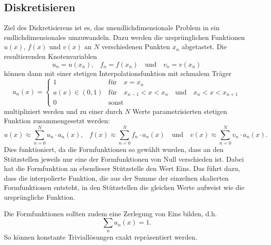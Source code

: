 \subsection{Diskretisieren\label{fem:1d:diskretisieren}}
Ziel des Diskretisierens ist es, das unendlichdimensionale Problem in ein endlichdimensionales umzuwandeln.
Dazu werden die ursprünglichen Funktionen $u(x)$, $f(x)$ und $v(x)$ an $N$ verschiedenen Punkten $x_n$ abgetastet.
Die resultierenden Knotenvariablen
\begin{equation}
    u_n = u(x_n) 
    \text{,} \quad
    f_n = f(x_n)
    \quad \text{und} \quad
    v_n = v(x_n)
\end{equation}
können dann mit einer stetigen Interpolationsfunktion mit schmalem Träger
\begin{equation}
    a_n(x) = \left\{ \begin{array}{ll}
        1
            & \text{für} \quad x = x_n \\
        a(x) \in (0, 1) 
            & \text{für} \quad x_{n-1} < x < x_n \quad \text{und} \quad x_n < x < x_{n+1} \\
        0
            & \text{sonst} 
    \end{array} \right.
\end{equation}
multipliziert werden und zu einer durch $N$ Werte parametrisierten stetigen Funktion zusammengesetzt werden:
\begin{equation}
    u(x) \approx \sum_{n=0}^{N}{u_n \cdot a_n(x)} 
    \text{,} \quad
    f(x) \approx \sum_{n=0}^{N}{f_n \cdot a_n(x)} 
    \quad \text{und} \quad
    v(x) \approx \sum_{n=0}^{N}{v_n \cdot a_n(x)}.
\end{equation}
Dies funktioniert, da die Formfunktionen so gewählt wurden, dass an den Stützstellen jeweils nur eine der Formfunktionen von Null verschieden ist.
Dabei hat die Formfunktion an ebendieser Stützstelle den Wert Eins.
Das führt dazu, dass die interpolierte Funktion, die aus der Summe der einzelnen skalierten Formfunktionen entsteht, in den Stützstellen die gleichen Werte aufweist wie die ursprüngliche Funktion.

Die Formfunktionen sollten zudem eine Zerlegung von Eins bilden, d.h.
\begin{equation}
    \sum_{n} a_n(x) = 1. \label{fem:1d:zerlegung_v_eins}
\end{equation}
So können konstante Triviallösungen exakt repräsentiert werden.

